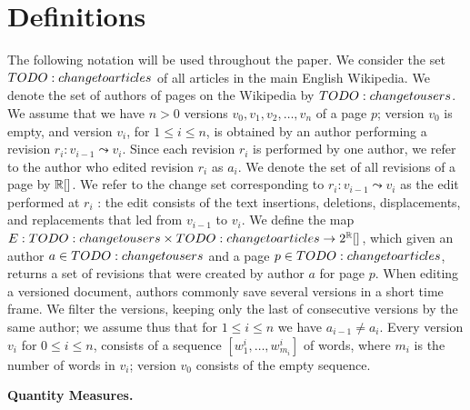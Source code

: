 \section{Definitions}

The following notation will be used throughout the paper.
We consider the set $TODO: change to articles$ of all articles in the main English 
Wikipedia.
We denote the set of authors of pages on the Wikipedia by
$TODO: change to users$.
We assume that we have $n > 0$ versions $v_0, v_1, v_2,
\ldots, v_n$ of a page $p$; version $v_0$ is empty, and version 
$v_i$, for $1 \le i \le n$, is obtained by an author performing 
a revision $r_i : v_{i-1} \leadsto v_i$.
Since each revision $r_i$ is performed by one author, we refer
to the author who edited revision $r_i$ as $a_i$.
We denote the set of all revisions of a page by $\revisions$.
We refer to the change set corresponding to 
$r_i : v_{i-1} \leadsto v_i$ as the edit performed at $r_i$ : the 
edit consists of the text insertions, deletions, displacements, 
and replacements that led from $v_{i-1}$ to $v_i$. 
We define the map $E : \authors \times \pages \to 2^\revisions$, 
which given an author $a \in TODO: change to users$ and a page $p \in TODO: change to articles$, returns a
set of revisions that were created by author $a$ for page $p$.
When editing a versioned document, authors commonly save several 
versions in a short time frame.
We filter the versions, keeping only the last of consecutive 
versions by the same author; we assume thus that for $1 \le i \le n$
we have $a_{i-1} \ne a_i$.
Every version $v_i$ for $0 \le i \le n$, consists of a sequence
$[w_1^i,\ldots,w_{m_i}^i]$ of words, where $m_i$ is the number
of words in $v_i$; version $v_0$ consists of the empty sequence.

\smallskip

\noindent\textbf{Quantity Measures.}


